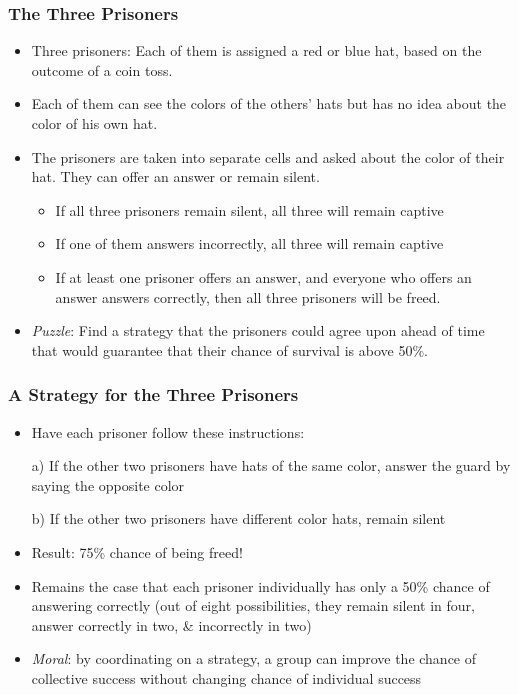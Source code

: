 \begin{frame}
\frametitle{The Three Prisoners}

\begin{itemize}[<+->]

\item Three prisoners: Each of them is assigned a red or blue hat, based on the outcome of a coin toss.
\item Each of them can see the colors of the others' hats but has no idea about the color of his own hat.
\item The prisoners are taken into separate cells and asked about the color of their hat. They can offer an answer or remain silent. 
\medskip
\begin{itemize}
\item If all three prisoners remain silent, all three will remain captive %
\item If one of them answers incorrectly, all three will remain captive %
\item If at least one prisoner offers an answer, and everyone who offers an answer answers correctly, then all three prisoners will be freed.
\end{itemize}
\medskip
\item \emph{Puzzle}: Find a strategy that the prisoners could agree upon ahead of time that would guarantee that their chance of survival is above 50\%.

\end{itemize}
\end{frame}

\begin{frame}
\frametitle{A Strategy for the Three Prisoners}

\begin{itemize}[<+->]

\item Have each prisoner follow these instructions:

\item[a)] If the other two prisoners have hats of the same color, answer the guard by saying the opposite color

\item[b)] If the other two prisoners have different color hats, remain silent

\item Result: 75\% chance of being freed! 

\item Remains the case that each prisoner individually has only a 50\% chance of answering correctly (out of eight possibilities, they remain silent in four, answer correctly in two, \& incorrectly in two)

\item \emph{Moral}: by coordinating on a strategy, a group can improve the chance of collective success without changing chance of individual success

\end{itemize}
\end{frame}

